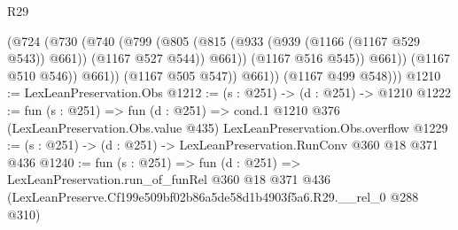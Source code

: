 \begin{lexlean}{R29}
\begin{coremodule}
                    (@724
                      (@730
                        (@740
                          (@799
                            (@805
                              (@815 (@933 (@939 (@1166 (@1167 @529 @543)) @661)) (@1167 @527 @544))
                              @661))
                          (@1167 @516 @545))
                        @661))
                    (@1167 @510 @546))
                  @661))
              (@1167 @505 @547))
            @661))
        (@1167 @499 @548)))
@1210 := LexLeanPreservation.Obs
@1212 := (s : @251) -> (d : @251) -> @1210
@1222 := fun (s : @251) =>
  fun (d : @251) =>
  cond.{1} @1210 @376 (LexLeanPreservation.Obs.value @435) LexLeanPreservation.Obs.overflow
@1229 := (s : @251) -> (d : @251) -> LexLeanPreservation.RunConv @360 @18 @371 @436
@1240 := fun (s : @251) =>
  fun (d : @251) =>
  LexLeanPreservation.run_of_funRel
    @360
    @18
    @371
    @436
    (LexLeanPreserve.Cf199e509bf02b86a5de58d1b4903f5a6.R29.__rel_0 @288 @310)
\end{coremodule}
\end{lexlean}
